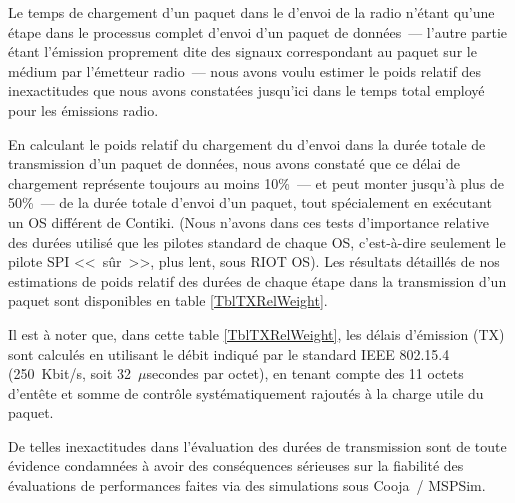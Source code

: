 \bigskip

Le temps de chargement d'un paquet dans le  d'envoi de la
radio n'étant qu'une étape dans le processus complet d'envoi d'un paquet
de données~--- l'autre partie étant l'émission proprement dite des
signaux correspondant au paquet sur le médium par l'émetteur radio~---
nous avons voulu estimer le poids relatif des inexactitudes que nous
avons constatées jusqu'ici dans le temps total employé pour les
émissions radio.

En calculant le poids relatif du chargement du  d'envoi
dans la durée totale de transmission d'un paquet de données, nous
avons constaté que ce délai de chargement représente toujours au moins
10\%~--- et peut monter jusqu'à plus de 50\%~--- de la durée totale
d'envoi d'un paquet, tout spécialement en exécutant un OS différent
de Contiki. (Nous n'avons dans ces tests d'importance relative des durées
utilisé que les pilotes standard de chaque OS, c'est-à-dire seulement
le pilote SPI <<~sûr~>>, plus lent, sous RIOT OS). Les résultats détaillés
de nos estimations de poids relatif des durées de chaque étape dans la
transmission d'un paquet sont disponibles en table \vref{TblTXRelWeight}.

Il est à noter que, dans cette table \ref{TblTXRelWeight}, les délais
d'émission (TX) sont calculés en utilisant le débit indiqué par le standard
IEEE 802.15.4 (250~Kbit/s, soit 32~$\mu$secondes par octet), en tenant
compte des 11 octets d'entête et somme de contrôle systématiquement rajoutés
à la charge utile du paquet.

De telles inexactitudes dans l'évaluation des durées de transmission sont
de toute évidence condamnées à avoir des conséquences sérieuses sur
la fiabilité des évaluations de performances faites via
des simulations sous Cooja~/ MSPSim.


\newcommand{\delayus}[1]{#1 $\mu$sec.}



